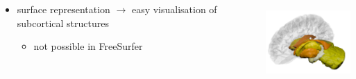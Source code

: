 \documentclass[10pt,xcolor=table,aspectratio=169]{beamer}
\begin{document}
\begin{frame}
\begin{itemize}
\begin{figure}
\end{figure}
\end{itemize}

\vspace{-1em}

\begin{columns}
 \begin{column}{0.5\textwidth}
 \begin{itemize}
   \item surface representation $\rightarrow$ easy visualisation of subcortical structures 
   \begin{itemize}
     \item not possible in FreeSurfer
   \end{itemize}
 \end{itemize}
 \end{column}
\begin{column}{0.5\textwidth}
  \includegraphics[height=3cm]{images/DK_output/Image_1_subcortical}
\end{column}
\end{columns}
 
 
 
 
 
 
\end{frame}
\end{document}
